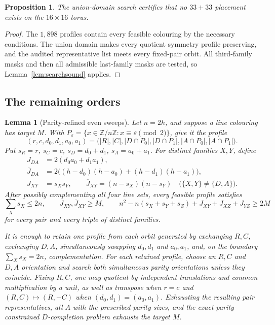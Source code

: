\documentclass[11pt]{amsart}
\newtheorem{lemma}[theorem]{Lemma}
\newtheorem{proposition}[theorem]{Proposition}
\theoremstyle{definition}
\theoremstyle{remark}
\newcommand{\Z}{\mathbb{Z}}
\newcommand{\Zn}{\Z/n\Z}
\begin{document}
\begin{proposition}\label{prop:t16sweep}
The union-domain search certifies that no $33+33$ placement exists on the
$16\times16$ torus.
\end{proposition}

\begin{proof}
The $1{,}898$ profiles contain every feasible colouring by the necessary
conditions.  The union domain makes every quotient symmetry profile
preserving, and the audited representative list meets every fixed-pair
orbit.  All third-family masks and then all admissible last-family masks are
tested, so Lemma~\ref{lem:searchsound} applies.
\end{proof}

\subsection{The remaining orders}\label{ssec:remaining}

\begin{lemma}[Parity-refined even sweeps]\label{lem:evensweep}
Let \(n=2h\), and suppose a line colouring has target \(M\).  With
\(P_\varepsilon=\{x\in\Zn:x\equiv\varepsilon\pmod2\}\), give it the profile
\[
(r,c,d_0,d_1,a_0,a_1)
=\bigl(|R|,|C|,|D\cap P_0|,|D\cap P_1|,
       |A\cap P_0|,|A\cap P_1|\bigr).
\]
Put \(s_R=r\), \(s_C=c\), \(s_D=d_0+d_1\), \(s_A=a_0+a_1\).  For distinct
families \(X,Y\), define
\[
\begin{aligned}
J_{DA}&=2(d_0a_0+d_1a_1),\\
\overline J_{DA}
&=2\bigl((h-d_0)(h-a_0)+(h-d_1)(h-a_1)\bigr),\\
J_{XY}&=s_Xs_Y,\qquad
\overline J_{XY}=(n-s_X)(n-s_Y)
\quad\bigl(\{X,Y\}\ne\{D,A\}\bigr).
\end{aligned}
\]
After possibly complementing all four line sets, every feasible profile
satisfies
\begin{equation}\label{eq:evenfilter}
\sum_X s_X\le2n,\qquad
J_{XY},\overline J_{XY}\ge M,\qquad
n^2-n(s_X+s_Y+s_Z)+J_{XY}+J_{XZ}+J_{YZ}\ge2M
\end{equation}
for every pair and every triple of distinct families.

It is enough to retain one profile from each orbit generated by exchanging
\(R,C\), exchanging \(D,A\), simultaneously swapping \(d_0,d_1\) and
\(a_0,a_1\), and, on the boundary \(\sum_X s_X=2n\), complementation.  For
each retained profile, choose an \(R,C\) and \(D,A\) orientation and search
both simultaneous parity orientations unless they coincide.  Fixing \(R,C\),
one may quotient by independent translations and common multiplication by a
unit, as well as transpose when \(r=c\) and \((R,C)\mapsto(R,-C)\) when
\((d_0,d_1)=(a_0,a_1)\).  Exhausting the resulting pair representatives,
all \(A\) with the prescribed parity sizes, and the exact parity-constrained
\(D\)-completion problem exhausts the target \(M\).
\end{lemma}
\end{document}
